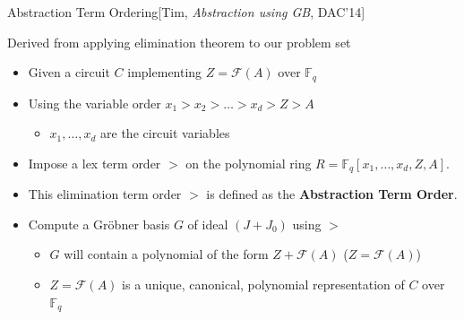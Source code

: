 \documentclass[xcolor=dvipsnames]{beamer}
\newcommand{\Fq}{{\mathbb{F}}_{q}}
\newcommand{\F}{{\mathcal{F}}}
\begin{document}

\begin{frame}{\large {Abstraction Term Ordering[Tim, {\it Abstraction using GB}, DAC'14]}}

Derived from applying elimination theorem to our problem set
\begin{itemize}
\item Given a circuit $C$ implementing $Z = \F(A)$ over $\Fq$
\item Using the variable order $x_1 > x_2 > \dots > x_d > Z > A$
	\begin{itemize}
	\item $x_1, \dots ,x_d$ are the circuit variables
	\end{itemize}
\item Impose a lex term order $>$ on the polynomial ring $R = \Fq[x_1,
  \dots, x_d, Z, A]$.
\item This elimination term order $>$ is defined as
the {\bf Abstraction Term Order}.

\item Compute a Gr\"obner basis $G$ of ideal $(J
+ J_0)$ using $>$
	\begin{itemize}
	\item $G$ will contain a polynomial of the form $Z + \F(A)$ ($Z = \F(A)$)
	\item $Z = \F(A)$ is a \alert{unique, canonical, polynomial}
  representation of $C$ over $\Fq$ 
	\end{itemize}
\end{itemize}
\end{frame}
\end{document}
